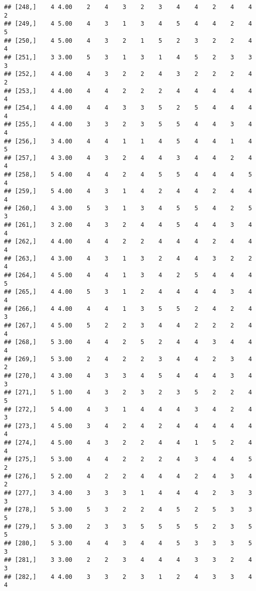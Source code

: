 \documentclass[]{article}
\begin{document}
\begin{verbatim}
## [248,]    4 4.00    2    4    3    2    3    4    4    2    4    4    2
## [249,]    4 5.00    4    3    1    3    4    5    4    4    2    4    5
## [250,]    4 5.00    4    3    2    1    5    2    3    2    2    4    4
## [251,]    3 3.00    5    3    1    3    1    4    5    2    3    3    3
## [252,]    4 4.00    4    3    2    2    4    3    2    2    2    4    2
## [253,]    4 4.00    4    4    2    2    2    4    4    4    4    4    4
## [254,]    4 4.00    4    4    3    3    5    2    5    4    4    4    4
## [255,]    4 4.00    3    3    2    3    5    5    4    4    3    4    4
## [256,]    3 4.00    4    4    1    1    4    5    4    4    1    4    5
## [257,]    4 3.00    4    3    2    4    4    3    4    4    2    4    4
## [258,]    5 4.00    4    4    2    4    5    5    4    4    4    5    4
## [259,]    5 4.00    4    3    1    4    2    4    4    2    4    4    4
## [260,]    4 3.00    5    3    1    3    4    5    5    4    2    5    3
## [261,]    3 2.00    4    3    2    4    4    5    4    4    3    4    4
## [262,]    4 4.00    4    4    2    2    4    4    4    2    4    4    4
## [263,]    4 3.00    4    3    1    3    2    4    4    3    2    2    4
## [264,]    4 5.00    4    4    1    3    4    2    5    4    4    4    5
## [265,]    4 4.00    5    3    1    2    4    4    4    4    3    4    4
## [266,]    4 4.00    4    4    1    3    5    5    2    4    2    4    3
## [267,]    4 5.00    5    2    2    3    4    4    2    2    2    4    4
## [268,]    5 3.00    4    4    2    5    2    4    4    3    4    4    4
## [269,]    5 3.00    2    4    2    2    3    4    4    2    3    4    2
## [270,]    4 3.00    4    3    3    4    5    4    4    4    3    4    3
## [271,]    5 1.00    4    3    2    3    2    3    5    2    2    4    5
## [272,]    5 4.00    4    3    1    4    4    4    3    4    2    4    3
## [273,]    4 5.00    3    4    2    4    2    4    4    4    4    4    4
## [274,]    4 5.00    4    3    2    2    4    4    1    5    2    4    4
## [275,]    5 3.00    4    4    2    2    2    4    3    4    4    5    2
## [276,]    5 2.00    4    2    2    4    4    4    2    4    3    4    2
## [277,]    3 4.00    3    3    3    1    4    4    4    2    3    3    3
## [278,]    5 3.00    5    3    2    2    4    5    2    5    3    3    5
## [279,]    5 3.00    2    3    3    5    5    5    5    2    3    5    5
## [280,]    5 3.00    4    4    3    4    4    5    3    3    3    5    3
## [281,]    3 3.00    2    2    3    4    4    4    3    3    2    4    3
## [282,]    4 4.00    3    3    2    3    1    2    4    3    3    4    4

\end{verbatim}
\end{document}
